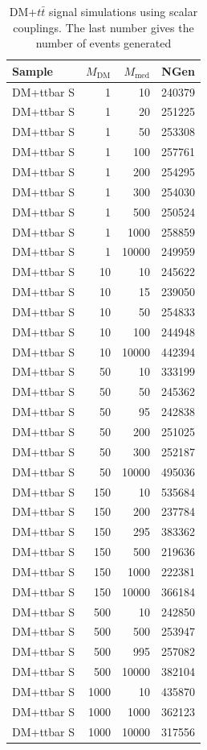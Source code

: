 \begin{table}[]
\centering
\begin{tabular}{lrrr}
\hline \hline
Sample & $M_{\text{DM}}$    & $M_{\text{med}}$ & NGen \\
\hline
DM+ttbar  S  & 1    & 10    & 240379 \\
DM+ttbar  S  & 1    & 20    & 251225 \\
DM+ttbar  S  & 1    & 50    & 253308 \\
DM+ttbar  S  & 1    & 100   & 257761 \\
DM+ttbar  S  & 1    & 200   & 254295 \\
DM+ttbar  S  & 1    & 300   & 254030 \\
DM+ttbar  S  & 1    & 500   & 250524 \\
DM+ttbar  S  & 1    & 1000  & 258859 \\
DM+ttbar  S  & 1    & 10000 & 249959 \\
DM+ttbar  S  & 10   & 10    & 245622 \\
DM+ttbar  S  & 10   & 15    & 239050 \\
DM+ttbar  S  & 10   & 50    & 254833 \\
DM+ttbar  S  & 10   & 100   & 244948 \\
DM+ttbar  S  & 10   & 10000 & 442394 \\
DM+ttbar  S  & 50   & 10    & 333199 \\
DM+ttbar  S  & 50   & 50    & 245362 \\
DM+ttbar  S  & 50   & 95    & 242838 \\
DM+ttbar  S  & 50   & 200   & 251025 \\
DM+ttbar  S  & 50   & 300   & 252187 \\
DM+ttbar  S  & 50   & 10000 & 495036 \\
DM+ttbar  S  & 150  & 10    & 535684 \\
DM+ttbar  S  & 150  & 200   & 237784 \\
DM+ttbar  S  & 150  & 295   & 383362 \\
DM+ttbar  S  & 150  & 500   & 219636 \\
DM+ttbar  S  & 150  & 1000  & 222381 \\
DM+ttbar  S  & 150  & 10000 & 366184 \\
DM+ttbar  S  & 500  & 10    & 242850 \\
DM+ttbar  S  & 500  & 500   & 253947 \\
DM+ttbar  S  & 500  & 995   & 257082 \\
DM+ttbar  S  & 500  & 10000 & 382104 \\
DM+ttbar  S  & 1000 & 10    & 435870 \\
DM+ttbar  S  & 1000 & 1000  & 362123 \\
DM+ttbar  S  & 1000 & 10000 & 317556 \\
\hline \hline
\end{tabular}
\caption{DM+$t\bar{t}$ signal simulations using scalar couplings. The last number gives the number of events generated}
\label{tab:dmtt_s}
\end{table}

